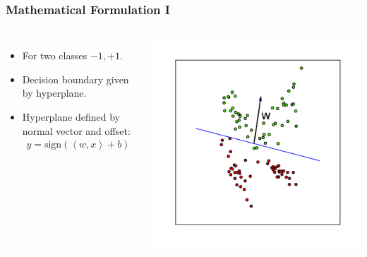 \begin{frame}
    \frametitle{Mathematical Formulation I}
    \begin{columns}
        \begin{itemize}
            \item For two classes $-1, +1$.
            \item Decision boundary given by hyperplane.
            \item Hyperplane defined by normal vector and offset:
                \begin{align*}
                    y = \text{sign}(\left<w, x\right> + b)
                \end{align*}
        \end{itemize}
            \includegraphics[width=1\linewidth]{logreg-pics/synthetic_line_w}\\

    \end{columns}
\end{frame}

